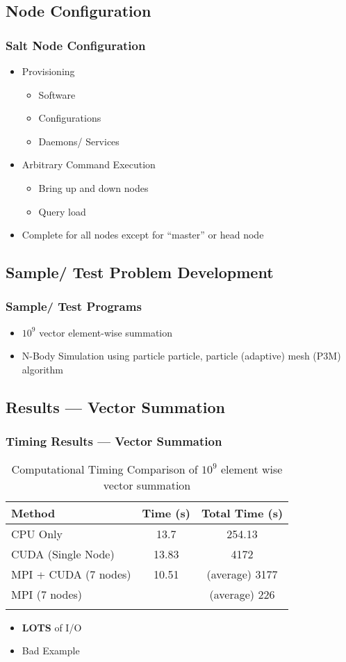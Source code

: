 \documentclass{beamer}
\begin{document}
\subsection{Node Configuration}
\begin{frame}
\frametitle{Salt Node Configuration}
\begin{itemize}
\item{Provisioning}
\begin{itemize}
\item{Software}
\item{Configurations}
\item{Daemons/ Services}
\end{itemize}
\item{Arbitrary Command Execution}
\begin{itemize}
\item{Bring up and down nodes}
\item{Query load}
\end{itemize}
\item{Complete for all nodes except for ``master'' or head node}
\end{itemize}
\end{frame}
\subsection{Sample/ Test Problem Development}
\begin{frame}
\frametitle{Sample/ Test Programs}
\begin{itemize}
\item{$ 10^{9} $ vector element-wise summation}
\item{N-Body Simulation using particle particle, particle (adaptive) mesh (P3M)
      algorithm}
\end{itemize}
\end{frame}
\subsection{Results --- Vector Summation}
\begin{frame}
\frametitle{Timing Results --- Vector Summation}
\begin{table}[htb]
\centering{}
\begin{tabular}{lcc}
\toprule{}
\textbf{Method} & \textbf{Time (s)} & \textbf{Total Time (s)} \\
\midrule{}
CPU Only & 13.7 & 254.13 \\
\midrule{}
CUDA (Single Node) & 13.83 & 4172 \\
\midrule{}
MPI + CUDA (7 nodes) & 10.51 & (average) 3177 \\
\midrule{}
MPI (7 nodes) & & (average) 226  \\
\bottomrule{}
\end{tabular}
\caption{Computational Timing Comparison of $ 10^9 $ element wise vector
summation}
\end{table}
\begin{itemize}
\item{\textbf{LOTS} of I/O}
\item{Bad Example}
\end{itemize}
\end{frame}
\end{document}
